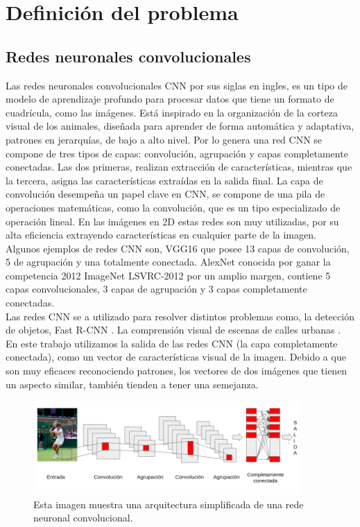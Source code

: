 \chapter{Definición del problema}\label{cap:trabajo_relacionado}


\section{Redes neuronales convolucionales}
Las redes neuronales convolucionales CNN por sus siglas en ingles, es un tipo de modelo de aprendizaje profundo para procesar datos que tiene un formato de cuadrícula, como las imágenes. Está inspirado en la organización de la corteza visual de los animales, diseñada para aprender de forma automática y adaptativa, patrones en jerarquías, de bajo a alto nivel. Por lo genera una red CNN se compone de tres tipos de capas: convolución, agrupación y capas completamente conectadas. Las dos primeras, realizan extracción de características, mientras que la tercera, asigna las características extraídas en la salida final. La capa de convolución desempeña un papel clave en CNN, se compone de una pila de operaciones matemáticas, como la convolución, que es un tipo especializado de operación lineal. En las imágenes en 2D estas redes son muy utilizadas, por su alta eficiencia extrayendo características en cualquier parte de la imagen. \\
Algunos ejemplos de redes CNN son, VGG16 que posee 13 capas de convolución, 5 de agrupación y una totalmente conectada. AlexNet conocida por ganar la competencia 2012 ImageNet LSVRC-2012 por un amplio margen, contiene 5 capas convolucionales, 3 capas de agrupación y 3 capas completamente conectadas.\\
Las redes CNN se a utilizado para resolver distintos problemas como, la detección de objetos, Fast R-CNN \cite{girshick2015fast}. La comprensión visual de escenas de calles urbanas \cite{cordts2016cityscapes}.
En este trabajo utilizamos la salida de las redes CNN (la capa completamente conectada), como un vector de características visual de la imagen. Debido a que son muy eficaces reconociendo patrones, los vectores de dos imágenes que tienen un aspecto similar, también tienden a tener una semejanza. 

\begin{figure}
	\centering
	\includegraphics[width=0.9\textwidth]{img/red_cnn.png}
	\caption{Esta imagen muestra una arquitectura simplificada de una rede neuronal convolucional.}
	\label{fig:EvolucionILSVRC}
\end{figure}

